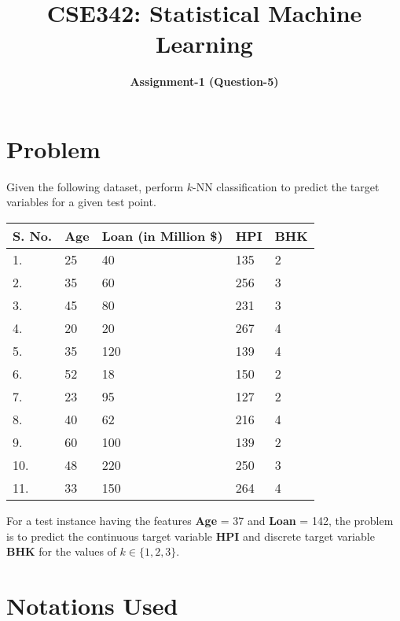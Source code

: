 \documentclass[12pt]{article}
\title{\textbf{CSE342: Statistical Machine Learning}}
\author{\textbf{Assignment-1 (Question-5)}}
\date{}
\begin{document}
    \maketitle

    \section*{Problem}

    Given the following dataset, perform $k$-NN classification
    to predict the target variables for a given test point.
    \vspace*{10pt}
    \renewcommand{\arraystretch}{1.75}
    \begin{center}
        \begin{tabular}{| m{15mm} | m{30mm} | m{50mm} | m{20mm} | m{20mm} |}
            \hline
            \large{\textbf{S. No.}} & \large{\textbf{Age}} & \large{\textbf{Loan (in Million \$)}}
                & \large{\textbf{HPI}} & \large{\textbf{BHK}} \\
            \hline
            \hline 1. & 25 & 40 & 135 & 2 \\
            \hline 2. & 35 & 60 & 256 & 3 \\
            \hline 3. & 45 & 80 & 231 & 3 \\
            \hline 4. & 20 & 20 & 267 & 4 \\
            \hline 5. & 35 & 120 & 139 & 4 \\
            \hline 6. & 52 & 18 & 150 & 2 \\
            \hline 7. & 23 & 95 & 127 & 2 \\
            \hline 8. & 40 & 62 & 216 & 4 \\
            \hline 9. & 60 & 100 & 139 & 2 \\
            \hline 10. & 48 & 220 & 250 & 3 \\
            \hline 11. & 33 & 150 & 264 & 4 \\
            \hline
        \end{tabular}
    \end{center}
    \vspace*{10pt}
    For a test instance having the features \textbf{Age} = 37 and \textbf{Loan} = 142,
    the problem is to predict the continuous target variable \textbf{HPI} and
    discrete target variable \textbf{BHK} for the values of $k \in \{ 1, 2, 3 \}$.

    \section*{Notations Used}
\end{document}
